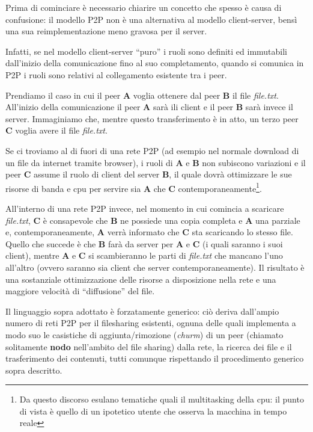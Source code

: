 Prima di cominciare è necessario chiarire un concetto che spesso è causa di confusione: il modello P2P non è una alternativa al modello client-server, bensì una sua reimplementazione meno gravosa per il server.

Infatti, se nel modello client-server ``puro'' i ruoli sono definiti ed immutabili dall'inizio della comunicazione fino al suo completamento, quando si comunica in P2P i ruoli sono relativi al collegamento esistente tra i peer.

Prendiamo il caso in cui il peer \textbf{A} voglia ottenere dal peer \textbf{B} il file \emph{file.txt}. All'inizio della comunicazione il peer \textbf{A} sarà ili client e il peer \textbf{B} sarà invece il server. Immaginiamo che, mentre questo transferimento è in atto, un terzo peer \textbf{C} voglia avere il file \emph{file.txt}.

Se ci troviamo al di fuori di una rete P2P (ad esempio nel normale download di un file da internet tramite browser), i ruoli di \textbf{A} e \textbf{B} non subiscono variazioni e il peer \textbf{C} assume il ruolo di client del server \textbf{B}, il quale dovrà ottimizzare le sue risorse di banda e cpu per servire sia \textbf{A} che \textbf{C} contemporaneamente\footnote{Da questo discorso esulano tematiche quali il multitasking della cpu: il punto di vista è quello di un ipotetico utente che osserva la macchina in tempo reale}.

All'interno di una rete P2P invece, nel momento in cui comincia a scaricare \emph{file.txt}, \textbf{C} è consapevole che \textbf{B} ne possiede una copia completa e \textbf{A} una parziale e, contemporaneamente, \textbf{A} verrà informato che \textbf{C} sta scaricando lo stesso file. Quello che succede è che \textbf{B} farà da server per \textbf{A} e \textbf{C} (i quali saranno i suoi client), mentre \textbf{A} e \textbf{C} si scambieranno le parti di \emph{file.txt} che mancano l'uno all'altro (ovvero saranno sia client che server contemporaneamente). Il risultato è una sostanziale ottimizzazione delle risorse a disposizione nella rete e una maggiore velocità di ``diffusione'' del file.

Il linguaggio sopra adottato è forzatamente generico: ciò deriva dall'ampio numero di reti P2P per il filesharing esistenti, ognuna delle quali implementa a modo suo le casistiche di aggiunta/rimozione (\emph{churm}) di un peer (chiamato solitamente \textbf{nodo} nell'ambito del file sharing) dalla rete, la ricerca dei file e il trasferimento dei contenuti, tutti comunque rispettando il procedimento generico sopra descritto.

